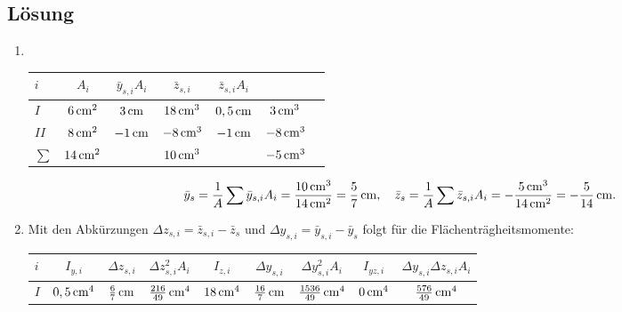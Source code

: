\documentclass{exercise}
\begin{document}
    \subsection*{Lösung}
    \begin{enumerate}
        \item\,
        \begin{center}
            \begin{tabular}{lcccccc}
                \toprule
                \(i\) & \(A_i\) & \(\bar{y}_{s, i}A_i\) & \(\bar{z}_{s, i}\) & \(\bar{z}_{s, i}A_i\)\\
                \midrule
                \(I\) & \(6\,\si{\centi\meter\squared}\) & \(3\,\si{\centi\meter}\) & \(18\,\si{\centi\meter\cubed}\) & \(0,5\,\si{\centi\meter}\) & \(3\,\si{\centi\meter\cubed}\)\\
                \(II\) & \(8\,\si{\centi\meter\squared}\) & \(-1\,\si{\centi\meter}\) & \(-8\,\si{\centi\meter\cubed}\) & \(-1\,\si{\centi\meter}\) & \(-8\,\si{\centi\meter\cubed}\)\\
                \midrule
                \(\sum\) & \(14\,\si{\centi\meter\squared}\) & & \(10\,\si{\centi\meter\cubed}\) & & \(-5\,\si{\centi\meter\cubed}\)\\
                \bottomrule
            \end{tabular}
        \end{center}
        \[
            \bar{y}_s = \frac{1}{A}\sum\bar{y}_{s, i}A_i = \frac{10\,\si{\centi\meter\cubed}}{14\,\si{\centi\meter\squared}} = \frac{5}{7}\,\si{\centi\meter}, \quad \bar{z}_s = \frac{1}{A}\sum\bar{z}_{s, i}A_i = -\frac{5\,\si{\centi\meter\cubed}}{14\,\si{\centi\meter\squared}} = -\frac{5}{14}\,\si{\centi\meter}.
        \]
        \item Mit den Abkürzungen \(\Delta z_{s, i} = \bar{z}_{s, i} - \bar{z}_s\) und \(\Delta y_{s, i} = \bar{y}_{s, i} - \bar{y}_s\) folgt für die Flächenträgheitsmomente:
        \begin{center}
            \begin{tabular}{lcccccccc}
                \toprule
                \(i\) & \(I_{y, i}\) & \(\Delta z_{s, i}\) & \(\Delta z_{s, i}^2 A_i\) & \(I_{z, i}\) & \(\Delta y_{s, i}\) & \(\Delta y_{s, i}^2 A_i\) & \(I_{yz, i}\) & \(\Delta y_{s, i}\Delta z_{s, i}A_i\)\\
                \midrule
                \(I\) & \(0,5\sis{\centi\meter\tothe{4}}\) & \(\frac{6}{7}\,\si{\centi\meter}\) & \(\frac{216}{49}\sis{\centi\meter\tothe{4}}\) & \(18\sis{\centi\meter\tothe{4}}\) & \(\frac{16}{7}\,\si{\centi\meter}\) & \(\frac{1536}{49}\sis{\centi\meter\tothe{4}}\) & \(0\sis{\centi\meter\tothe{4}}\) & \(\frac{576}{49}\sis{\centi\meter\tothe{4}}\)\\

\end{tabular}
\end{center}
\end{enumerate}
\end{document}
